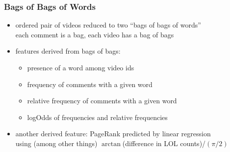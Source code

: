 \documentclass[fleqn]{beamer}
\begin{document}
\begin{frame}
\frametitle{Bags of Bags of Words}
      \begin{itemize}
         \item ordered pair of videos reduced to two ``bags of bags of words''  \\
                  each comment is a bag, each video has a bag of bags

         \item features derived from bags of bags:
             \begin{itemize}
                 \item presence of a word  among video ids 
                 \item frequency of comments with a given word
                 \item relative frequency of comments with a given word
                 \item  logOdds of frequencies and relative frequencies
              \end{itemize}
         
         \item another derived feature: PageRank predicted by linear regression\\ 
                  using (among other things) $\arctan$(difference in LOL counts)/$({\pi}/2)$
     
     \end{itemize}
\end{frame}
\end{document}
